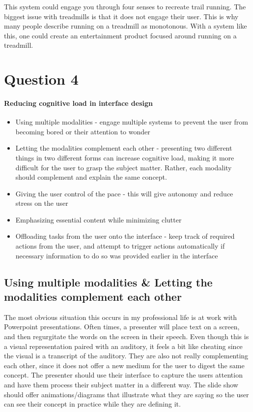 This system could engage you through four senses to recreate trail running. The biggest issue with treadmills is that it does not engage their user. This is why many people describe running on a treadmill as monotonous. With a system like this, one could create an entertainment product focused around running on a treadmill.

\section{Question 4}

\paragraph{Reducing cognitive load in interface design}
\begin{itemize}
\item
  Using multiple modalities - engage multiple systems to prevent the user from becoming bored or their attention to wonder
\item
  Letting the modalities complement each other - presenting two different things in two different forms can increase cognitive load, making it more difficult for the user to grasp the subject matter. Rather, each modality should complement and explain the same concept.
\item
  Giving the user control of the pace - this will give autonomy and reduce stress on the user
\item
  Emphasizing essential content while minimizing clutter
\item
  Offloading tasks from the user onto the interface - keep track of required actions from the user, and attempt to trigger actions automatically if necessary information to do so was provided earlier in the interface
\end{itemize}

\subsection{Using multiple modalities & Letting the modalities complement each other}
The most obvious situation this occurs in my professional life is at work with Powerpoint presentations. Often times, a presenter will place text on a screen, and then regurgitate the words on the screen in their speech. Even though this is a visual representation paired with an auditory, it feels a bit like cheating since the visual is a transcript of the auditory. They are also not really complementing each other, since it does not offer a new medium for the user to digest the same concept. The presenter should use their interface to capture the users attention and have them process their subject matter in a different way. The slide show should offer animations/diagrams that illustrate what they are saying so the user can see their concept in practice while they are defining it.


